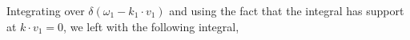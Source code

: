 Integrating over $\delta(\omega_1-k_1\cdot v_1)$ and using the fact that the integral has support at $k\cdot v_1=0$, we left with the following integral,
{%
}
